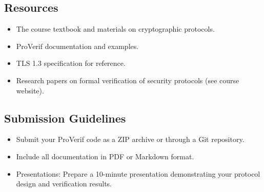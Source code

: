 \documentclass[10pt,a4paper,american]{exam}
\begin{document}
\subsection*{Resources}
\begin{itemize}
	\item The course textbook and materials on cryptographic protocols.
	\item ProVerif documentation and examples.
	\item TLS 1.3 specification for reference.
	\item Research papers on formal verification of security protocols (see course website).
\end{itemize}

\subsection*{Submission Guidelines}
\begin{itemize}
	\item Submit your ProVerif code as a ZIP archive or through a Git repository.
	\item Include all documentation in PDF or Markdown format.
	\item Presentations: Prepare a 10-minute presentation demonstrating your protocol design and verification results.
\end{itemize}
\end{document}
